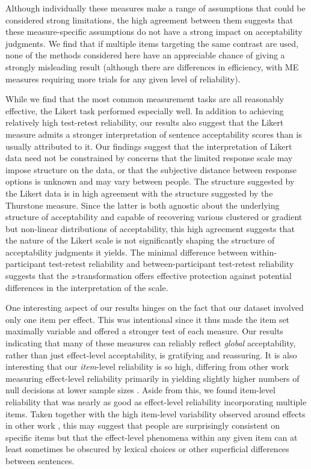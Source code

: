 \documentclass[doc]{apa6}
\newcommand{\ME}{{\sc ME}}%
\newcommand{\thurstone}{{\sc Thurstone}}
\newcommand{\likert}{{\sc Likert}}
\begin{document}
Although individually these measures make a range of assumptions that could be considered strong limitations, the high agreement between them suggests that these measure-specific assumptions do not have a strong impact on acceptability judgments. We find that if multiple items targeting the same contrast are used, none of the methods considered here have an appreciable chance of giving a strongly misleading result (although there are differences in efficiency, with \ME{} measures requiring more trials for any given level of reliability).

While we find that the most common measurement tasks are all reasonably effective, the \likert{} task performed especially well. In addition to achieving relatively high test-retest reliability, our results also suggest that the \likert{} measure admits a stronger interpretation of sentence acceptability scores than is usually attributed to it. Our findings suggest that the interpretation of \likert{} data need not be constrained by concerns that the limited response scale may impose structure on the data, or that the subjective distance between response options is unknown and may vary between people. The structure suggested by the \likert{} data is in high agreement with the structure suggested by the \thurstone{} measure. Since the latter is both agnostic about the underlying structure of acceptability and capable of recovering various clustered or gradient but non-linear distributions of acceptability, this high agreement suggests that the nature of the \likert{} scale is not significantly shaping the structure of acceptability judgments it yields. The minimal difference between within-participant test-retest reliability and between-participant test-retest reliability suggests that the {\it z}-transformation offers effective protection against potential differences in the interpretation of the scale.

One interesting aspect of our results hinges on the fact that our dataset involved only one item per effect. This was intentional since it thus made the item set maximally variable and offered a stronger test of each measure. Our results indicating that many of these measures can reliably reflect {\it global} acceptability, rather than just effect-level acceptability, is gratifying and reassuring. It is also interesting that our {\it item}-level reliability is so high, differing from other work measuring effect-level reliability primarily in yielding slightly higher numbers of null decisions at lower sample sizes \citep{sprouse2013formalinformal,mahowald2016snap,haussler2016replicationposter}. Aside from this, we found item-level reliability that was nearly as good as effect-level reliability incorporating multiple items. Taken together with the high item-level variability observed around effects in other work \citep{sprouse2013formalinformal}, this may suggest that people are surprisingly consistent on specific items but that the effect-level phenomena within any given item can at least sometimes be obscured by lexical choices or other superficial differences between sentences.
\end{document}
